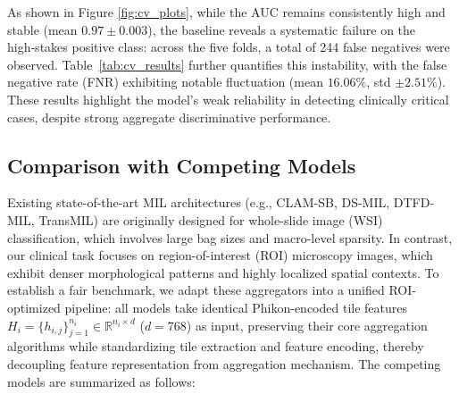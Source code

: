 \documentclass[journal,twoside,web]{ieeecolor}
\begin{document}
\begin{table}[htbp]
    \centering
    \caption{The prediction performance of baseline model.}
    \label{tab:cv_results}
\end{table}

As shown in Figure \ref{fig:cv_plots}, while the AUC remains consistently high and stable (mean $0.97 \pm 0.003$), the baseline reveals a systematic failure on the high‑stakes positive class: across the five folds, a total of 244 false negatives were observed. Table~\ref{tab:cv_results} further quantifies this instability, with the false negative rate (FNR) exhibiting notable fluctuation (mean $16.06\%$, std $\pm 2.51\%$). These results highlight the model's weak reliability in detecting clinically critical cases, despite strong aggregate discriminative performance.


\subsection{Comparison with Competing Models}\label{S3-3}

Existing state-of-the-art MIL architectures (e.g., CLAM-SB, DS-MIL, DTFD-MIL, TransMIL) are originally designed for whole-slide image (WSI) classification, which involves large bag sizes and macro-level sparsity. In contrast, our clinical task focuses on region-of-interest (ROI) microscopy images, which exhibit denser morphological patterns and highly localized spatial contexts. To establish a fair benchmark, we adapt these aggregators into a unified ROI-optimized pipeline: all models take identical Phikon-encoded \cite{filiot2023scaling} tile features $H_i = \{h_{i,j}\}_{j=1}^{n_i} \in \mathbb{R}^{n_i \times d}$ ($d=768$) as input, preserving their core aggregation algorithms while standardizing tile extraction and feature encoding, thereby decoupling feature representation from aggregation mechanism. The competing models are summarized as follows:
\end{document}
